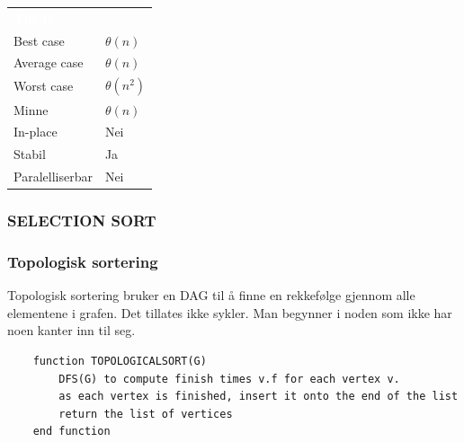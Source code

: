 \begin{table}[H]
    \label{tab:bucketsort}
    \centering
    \begin{tabular}{|L{15em} | L{15em}|}
        \hline
        \textbf{\textcolor{white}{Tilfelle}} & \textbf{\textcolor{white}{}}\\
        Best case & $\theta(n)$\\
        Average case & $\theta(n)$\\
        Worst case & $\theta(n^2)$\\
        Minne & $\theta(n)$\\
        In-place & Nei\\
        Stabil & Ja\\
        Paralelliserbar & Nei\\
         \hline
    \end{tabular}
\end{table}

\subsubsection{SELECTION SORT}

\subsubsection{Topologisk sortering}
Topologisk sortering bruker en DAG til å finne en rekkefølge gjennom alle elementene i grafen. Det tillates ikke sykler. Man begynner i noden som ikke har noen kanter inn til seg.

\begin{lstlisting}
    function TOPOLOGICALSORT(G)
    	DFS(G) to compute finish times v.f for each vertex v.
    	as each vertex is finished, insert it onto the end of the list
    	return the list of vertices
    end function
\end{lstlisting}

